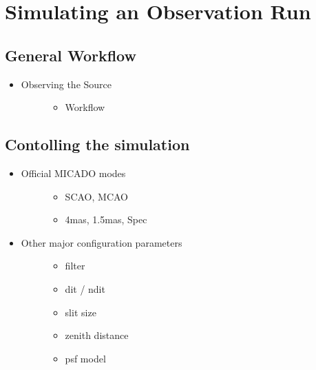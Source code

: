 

\section{Simulating an Observation Run%
  \label{simulating-an-observation-run}%
}


\subsection{General Workflow%
  \label{general-workflow}%
}

\begin{itemize}
\item 
\begin{description}
\item[{Observing the Source}] \leavevmode 
\begin{itemize}
\item Workflow
\end{itemize}

\end{description}
\end{itemize}


\subsection{Contolling the simulation%
  \label{contolling-the-simulation}%
}

\begin{itemize}
\item 
\begin{description}
\item[{Official MICADO modes}] \leavevmode 
\begin{itemize}
\item SCAO, MCAO

\item 4mas, 1.5mas, Spec
\end{itemize}

\end{description}

\item 
\begin{description}
\item[{Other major configuration parameters}] \leavevmode 
\begin{itemize}
\item filter

\item dit / ndit

\item slit size

\item zenith distance

\item psf model
\end{itemize}

\end{description}
\end{itemize}
